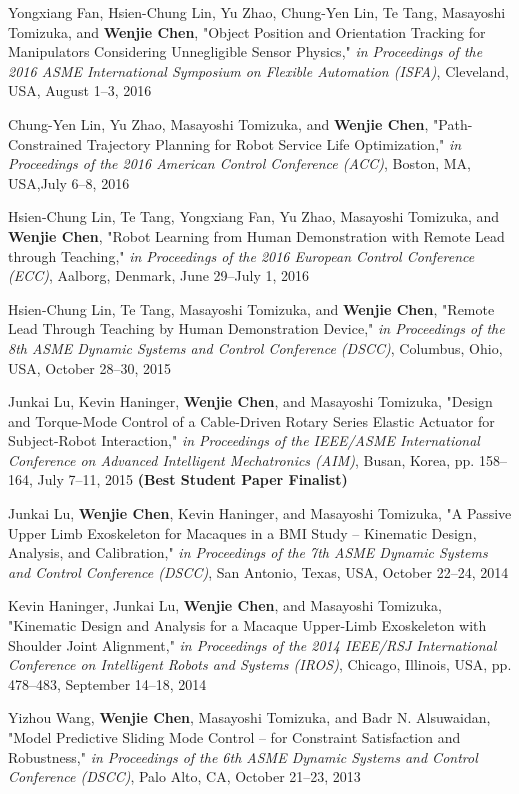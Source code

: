 \documentclass[UTF8,nofonts]{res}
\begin{document}
\begin{resume}
\begin{etaremune}[start=26]
    \item Yongxiang Fan, Hsien-Chung Lin, Yu Zhao, Chung-Yen Lin, Te Tang, Masayoshi Tomizuka, and \textbf{Wenjie Chen}, "Object Position and Orientation Tracking for Manipulators Considering Unnegligible Sensor Physics," \emph{in Proceedings of the 2016 ASME International Symposium on Flexible Automation (ISFA)}, Cleveland, USA, August 1--3, 2016
    \item Chung-Yen Lin, Yu Zhao, Masayoshi Tomizuka, and \textbf{Wenjie Chen}, "Path-Constrained Trajectory Planning for Robot Service Life Optimization," \emph{in Proceedings of the 2016 American Control Conference (ACC)}, Boston, MA, USA,July 6--8, 2016
    \item Hsien-Chung Lin, Te Tang, Yongxiang Fan, Yu Zhao, Masayoshi Tomizuka, and \textbf{Wenjie Chen}, "Robot Learning from Human Demonstration with Remote Lead through Teaching," \emph{in Proceedings of the 2016 European Control Conference (ECC)}, Aalborg, Denmark, June 29--July 1, 2016
    \item Hsien-Chung Lin, Te Tang, Masayoshi Tomizuka, and \textbf{Wenjie Chen}, "Remote Lead Through Teaching by Human Demonstration Device," \emph{in Proceedings of the 8th ASME Dynamic Systems and Control Conference (DSCC)}, Columbus, Ohio, USA, October 28--30, 2015
    \item Junkai Lu, Kevin Haninger, \textbf{Wenjie Chen}, and Masayoshi Tomizuka, "Design and Torque-Mode Control of a Cable-Driven Rotary Series Elastic Actuator for Subject-Robot Interaction," \emph{in Proceedings of the IEEE/ASME International Conference on Advanced Intelligent Mechatronics (AIM)}, Busan, Korea, pp. 158--164, July 7--11, 2015 \textbf{(Best Student Paper Finalist)} 
    \item Junkai Lu, \textbf{Wenjie Chen}, Kevin Haninger, and Masayoshi Tomizuka, "A Passive Upper Limb Exoskeleton for Macaques in a BMI Study -- Kinematic Design, Analysis, and Calibration," \emph{in Proceedings of the 7th ASME Dynamic Systems and Control Conference (DSCC)}, San Antonio, Texas, USA, October 22--24, 2014
    \item Kevin Haninger, Junkai Lu, \textbf{Wenjie Chen}, and Masayoshi Tomizuka, "Kinematic Design and Analysis for a Macaque Upper-Limb Exoskeleton with Shoulder Joint Alignment," \emph{in Proceedings of the 2014 IEEE/RSJ International Conference on Intelligent Robots and Systems (IROS)}, Chicago, Illinois, USA, pp. 478--483, September 14--18, 2014
    \item Yizhou Wang, \textbf{Wenjie Chen}, Masayoshi Tomizuka, and Badr N. Alsuwaidan, "Model Predictive Sliding Mode Control -- for Constraint Satisfaction and Robustness," \emph{in Proceedings of the 6th ASME Dynamic Systems and Control Conference (DSCC)}, Palo Alto, CA, October 21--23, 2013

\end{etaremune}
\end{resume}
\end{document}
